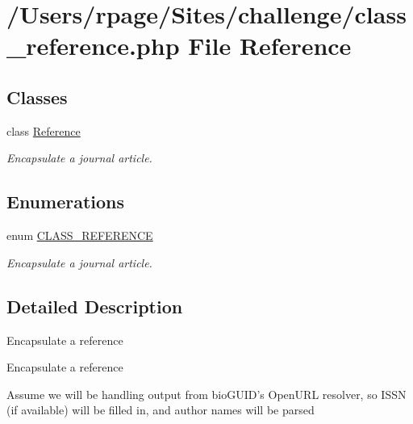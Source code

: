 \hypertarget{class__reference_8php}{
\section{/Users/rpage/Sites/challenge/class\_\-reference.php File Reference}
\label{class__reference_8php}
}
\subsection*{Classes}
\begin{CompactItemize}
\item 
class \hyperlink{class_reference}{Reference}
\begin{CompactList}\small\item\em Encapsulate a journal article. \item\end{CompactList}\end{CompactItemize}
\subsection*{Enumerations}
\begin{CompactItemize}
\item 
enum \hyperlink{class__reference_8php_447e5032ddf48d136c9abe6b64a4e1d9}{CLASS\_\-REFERENCE} 
\begin{CompactList}\small\item\em Encapsulate a journal article. \item\end{CompactList}\end{CompactItemize}


\subsection{Detailed Description}
Encapsulate a reference

Encapsulate a reference

Assume we will be handling output from bioGUID's OpenURL resolver, so ISSN (if available) will be filled in, and author names will be parsed 